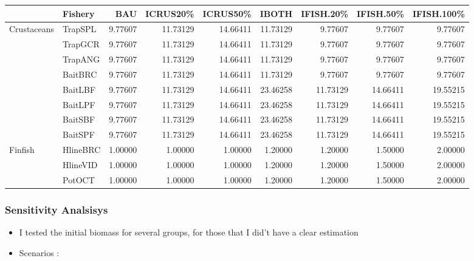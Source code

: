 \documentclass[11pt]{article}
\begin{document}
\begin{center}
\begin{tabular}{llrrrrrrr}
              &  Fishery   &      BAU  &  ICRUS20\%  &  ICRUS50\%  &     IBOTH  &  IFISH.20\%  &  IFISH.50\%  &  IFISH.100\%  \\
\hline
 Crustaceans  &  TrapSPL   &  9.77607  &   11.73129  &   14.66411  &  11.73129  &     9.77607  &     9.77607  &      9.77607  \\
              &  TrapGCR   &  9.77607  &   11.73129  &   14.66411  &  11.73129  &     9.77607  &     9.77607  &      9.77607  \\
              &  TrapANG   &  9.77607  &   11.73129  &   14.66411  &  11.73129  &     9.77607  &     9.77607  &      9.77607  \\
              &  BaitBRC   &  9.77607  &   11.73129  &   14.66411  &  11.73129  &     9.77607  &     9.77607  &      9.77607  \\
              &  BaitLBF   &  9.77607  &   11.73129  &   14.66411  &  23.46258  &    11.73129  &    14.66411  &     19.55215  \\
              &  BaitLPF   &  9.77607  &   11.73129  &   14.66411  &  23.46258  &    11.73129  &    14.66411  &     19.55215  \\
              &  BaitSBF   &  9.77607  &   11.73129  &   14.66411  &  23.46258  &    11.73129  &    14.66411  &     19.55215  \\
              &  BaitSPF   &  9.77607  &   11.73129  &   14.66411  &  23.46258  &    11.73129  &    14.66411  &     19.55215  \\
\hline
 Finfish      &  HlineBRC  &  1.00000  &    1.00000  &    1.00000  &   1.20000  &     1.20000  &     1.50000  &      2.00000  \\
              &  HlineVID  &  1.00000  &    1.00000  &    1.00000  &   1.20000  &     1.20000  &     1.50000  &      2.00000  \\
              &  PotOCT    &  1.00000  &    1.00000  &    1.00000  &   1.20000  &     1.20000  &     1.50000  &      2.00000  \\
\end{tabular}
\end{center}
\subsubsection*{Sensitivity Analsisys}
\label{sec-6-3}

\begin{itemize}
\item I tested the initial biomass for several groups, for those that I did't have a clear estimation
\item Scenarios :
\end{itemize}
\end{document}
